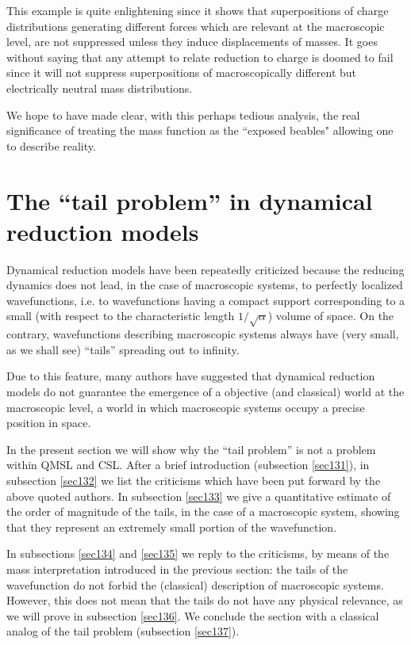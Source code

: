 \documentclass[12pt]{article}
\begin{document}
This example is quite enlightening since it shows that
superpositions of charge distributions generating different forces
which are relevant at the macroscopic level, are not suppressed
unless they induce displacements of masses. It goes without saying
that any attempt to relate reduction to charge is doomed to fail
since it will not suppress superpositions of macroscopically
different but electrically neutral mass distributions.

We hope to have made clear, with this perhaps tedious analysis,
the real significance of treating the mass function as the
``exposed beables" allowing one to describe reality.



\section{The ``tail problem'' in dynamical reduction models}
\label{sec013}

Dynamical reduction models have been repeatedly criticized because
the reducing dynamics does not lead, in the case of macroscopic
systems, to perfectly localized wavefunctions, i.e. to
wavefunctions having a compact support corresponding to a small
(with respect to the characteristic length $1/\sqrt{\alpha}$)
volume of space. On the contrary, wavefunctions describing
macroscopic systems always have (very small, as we shall see)
``tails'' spreading out to infinity.

Due to this feature, many authors \cite{shi90,alo1,lew,cli1,cli2}
have suggested that dynamical reduction models do not guarantee
the emergence of a objective (and classical) world at the
macroscopic level, a world in which macroscopic systems occupy a
precise position in space.

In the present section we will show why the ``tail problem'' is
not a problem within QMSL and CSL. After a brief introduction
(subsection \ref{sec131}), in subsection \ref{sec132} we list the
criticisms which have been put forward by the above quoted
authors. In subsection \ref{sec133} we give a quantitative
estimate of the order of magnitude of the tails, in the case of a
macroscopic system, showing that they represent an extremely small
portion of the wavefunction.

In subsections \ref{sec134} and \ref{sec135} we reply to the
criticisms, by means of the mass interpretation introduced in the
previous section: the tails of the wavefunction do not forbid the
(classical) description of macroscopic systems. However, this does
not mean that the tails do not have any  physical relevance, as we
will prove in subsection \ref{sec136}. We conclude the section
with a classical analog of the tail problem (subsection
\ref{sec137}).
\end{document}
